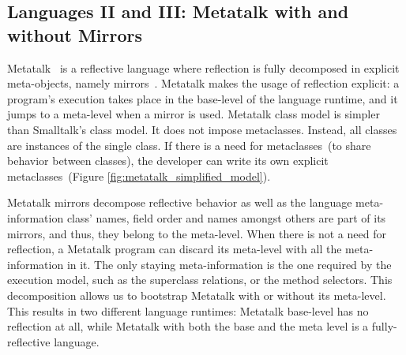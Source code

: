 


\subsection{Languages II and III: Metatalk with and without Mirrors} \label{sec:bootstrap_metatalk}

Metatalk~\cite{Papo11a} is a reflective language where reflection is fully decomposed in explicit meta-objects, namely mirrors~\cite{Brac04b}. Metatalk makes the usage of reflection explicit: a program's execution takes place in the base-level of the language runtime, and it jumps to a meta-level when a mirror is used. Metatalk class model is simpler than Smalltalk's class model. It does not impose metaclasses. Instead, all classes are instances of the single  class. If there is a need for metaclasses~(to share behavior between classes), the developer can write its own explicit metaclasses~(Figure \ref{fig:metatalk_simplified_model}).

Metatalk mirrors decompose reflective behavior as well as the language meta-information \ie class' names, field order and names amongst others are part of its mirrors, and thus, they belong to the meta-level. When there is not a need for reflection, a Metatalk program can discard its meta-level with all the meta-information in it. The only staying meta-information is the one required by the \VMs execution model, such as the superclass relations, or the method selectors. This decomposition allows us to bootstrap Metatalk with or without its meta-level. This results in two different language runtimes: Metatalk base-level has no reflection at all, while Metatalk with both the base and the meta level is a fully-reflective language.

